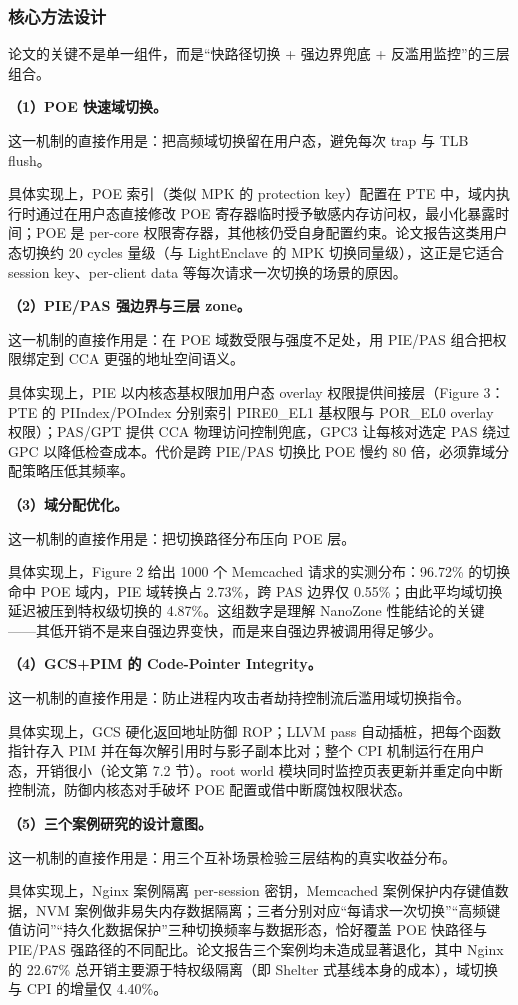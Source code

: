 \documentclass[11pt]{ctexart}
\begin{document}
\subsubsection{核心方法设计}
论文的关键不是单一组件，而是“快路径切换 + 强边界兜底 + 反滥用监控”的三层组合。\par
\noindent\textbf{（1）POE 快速域切换。}\par
这一机制的直接作用是：把高频域切换留在用户态，避免每次 trap 与 TLB flush。\par
具体实现上，POE 索引（类似 MPK 的 protection key）配置在 PTE 中，域内执行时通过在用户态直接修改 POE 寄存器临时授予敏感内存访问权，最小化暴露时间；POE 是 per-core 权限寄存器，其他核仍受自身配置约束。论文报告这类用户态切换约 20 cycles 量级（与 LightEnclave 的 MPK 切换同量级），这正是它适合 session key、per-client data 等每次请求一次切换的场景的原因。\par
\noindent\textbf{（2）PIE/PAS 强边界与三层 zone。}\par
这一机制的直接作用是：在 POE 域数受限与强度不足处，用 PIE/PAS 组合把权限绑定到 CCA 更强的地址空间语义。\par
具体实现上，PIE 以内核态基权限加用户态 overlay 权限提供间接层（Figure 3：PTE 的 PIIndex/POIndex 分别索引 PIRE0\_EL1 基权限与 POR\_EL0 overlay 权限）；PAS/GPT 提供 CCA 物理访问控制兜底，GPC3 让每核对选定 PAS 绕过 GPC 以降低检查成本。代价是跨 PIE/PAS 切换比 POE 慢约 80 倍，必须靠域分配策略压低其频率。\par
\noindent\textbf{（3）域分配优化。}\par
这一机制的直接作用是：把切换路径分布压向 POE 层。\par
具体实现上，Figure 2 给出 1000 个 Memcached 请求的实测分布：96.72\% 的切换命中 POE 域内，PIE 域转换占 2.73\%，跨 PAS 边界仅 0.55\%；由此平均域切换延迟被压到特权级切换的 4.87\%。这组数字是理解 NanoZone 性能结论的关键——其低开销不是来自强边界变快，而是来自强边界被调用得足够少。\par
\noindent\textbf{（4）GCS+PIM 的 Code-Pointer Integrity。}\par
这一机制的直接作用是：防止进程内攻击者劫持控制流后滥用域切换指令。\par
具体实现上，GCS 硬化返回地址防御 ROP；LLVM pass 自动插桩，把每个函数指针存入 PIM 并在每次解引用时与影子副本比对；整个 CPI 机制运行在用户态，开销很小（论文第 7.2 节）。root world 模块同时监控页表更新并重定向中断控制流，防御内核态对手破坏 POE 配置或借中断腐蚀权限状态。\par
\noindent\textbf{（5）三个案例研究的设计意图。}\par
这一机制的直接作用是：用三个互补场景检验三层结构的真实收益分布。\par
具体实现上，Nginx 案例隔离 per-session 密钥，Memcached 案例保护内存键值数据，NVM 案例做非易失内存数据隔离；三者分别对应“每请求一次切换”“高频键值访问”“持久化数据保护”三种切换频率与数据形态，恰好覆盖 POE 快路径与 PIE/PAS 强路径的不同配比。论文报告三个案例均未造成显著退化，其中 Nginx 的 22.67\% 总开销主要源于特权级隔离（即 Shelter 式基线本身的成本），域切换与 CPI 的增量仅 4.40\%。\par
\end{document}
